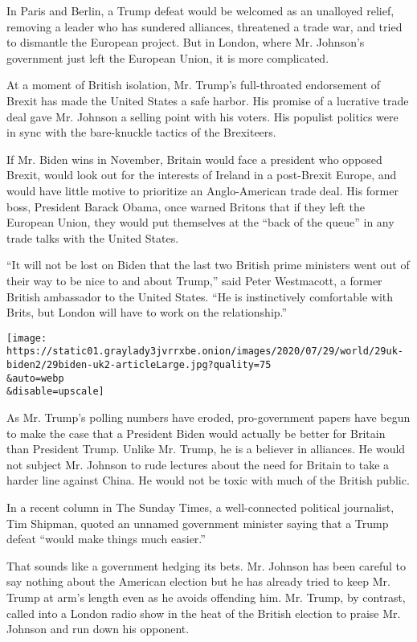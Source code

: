 In Paris and Berlin, a Trump defeat would be welcomed as an unalloyed
relief, removing a leader who has sundered alliances, threatened a trade
war, and tried to dismantle the European project. But in London, where
Mr. Johnson's government just left the European Union, it is more
complicated.

At a moment of British isolation, Mr. Trump's full-throated endorsement
of Brexit has made the United States a safe harbor. His promise of a
lucrative trade deal gave Mr. Johnson a selling point with his voters.
His populist politics were in sync with the bare-knuckle tactics of the
Brexiteers.

If Mr. Biden wins in November, Britain would face a president who
opposed Brexit, would look out for the interests of Ireland in a
post-Brexit Europe, and would have little motive to prioritize an
Anglo-American trade deal. His former boss, President Barack Obama, once
warned Britons that if they left the European Union, they would put
themselves at the ``back of the queue'' in any trade talks with the
United States.

``It will not be lost on Biden that the last two British prime ministers
went out of their way to be nice to and about Trump,'' said Peter
Westmacott, a former British ambassador to the United States. ``He is
instinctively comfortable with Brits, but London will have to work on
the relationship.''

\texttt{[image: https://static01.graylady3jvrrxbe.onion/images/2020/07/29/world/29uk-biden2/29biden-uk2-articleLarge.jpg?quality=75\\\&auto=webp\\\&disable=upscale]}

As Mr. Trump's polling numbers have eroded, pro-government papers have
begun to make the case that a President Biden would actually be better
for Britain than President Trump. Unlike Mr. Trump, he is a believer in
alliances. He would not subject Mr. Johnson to rude lectures about the
need for Britain to take a harder line against China. He would not be
toxic with much of the British public.

In a recent column in The Sunday Times, a well-connected political
journalist, Tim Shipman, quoted an unnamed government minister saying
that a Trump defeat ``would make things much easier.''

That sounds like a government hedging its bets. Mr. Johnson has been
careful to say nothing about the American election but he has already
tried to keep Mr. Trump at arm's length even as he avoids offending him.
Mr. Trump, by contrast, called into a London radio show in the heat of
the British election to praise Mr. Johnson and run down his opponent.

